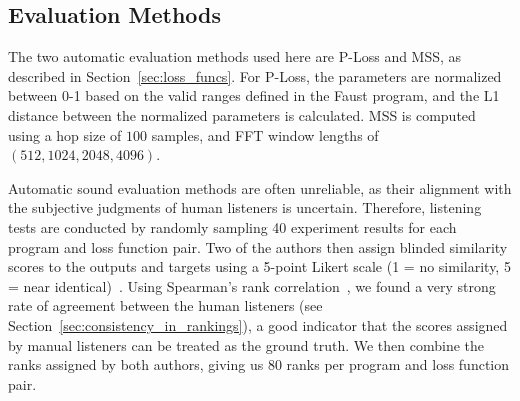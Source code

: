 \subsection{Evaluation Methods}
\label{sec:evaluation_manual_auto}
The two automatic evaluation methods used here are P-Loss and MSS, as described in Section~\ref{sec:loss_funcs}. For P-Loss, the parameters are normalized between 0-1 based on the valid ranges defined in the Faust program, and the L1 distance between the normalized parameters is calculated. MSS is computed using a hop size of $100$ samples, and FFT window lengths of $(512, 1024, 2048, 4096)$. 

Automatic sound evaluation methods are often unreliable, as their alignment with the subjective judgments of human listeners is uncertain. Therefore, listening tests are conducted by randomly sampling 40 experiment results for each program and loss function pair. Two of the authors then assign blinded similarity scores to the outputs and targets using a 5-point Likert scale (1 = no similarity, 5 = near identical)~\cite{jebb2021review}. Using Spearman's rank correlation~\cite{spearman1987proof,rebekic2015pearson}, we found a very strong rate of agreement between the human listeners (see Section~\ref{sec:consistency_in_rankings}), a good indicator that the scores assigned by manual listeners can be treated as the ground truth. We then combine the ranks assigned by both authors, giving us 80 ranks per program and loss function pair. 





